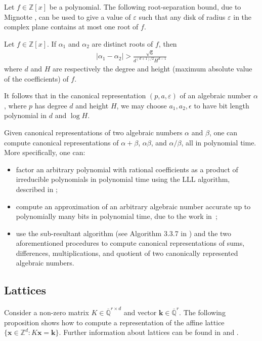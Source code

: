 Let $f\in\mathbb{Z}[x]$ be a polynomial.  The following
root-separation bound, due to Mignotte \cite{Mig82}, can be used to
give a value of $\varepsilon$ such that any disk of radius
$\varepsilon$ in the complex plane contains at most one root of $f$.
\begin{proposition}
Let $f\in\mathbb{Z}[x]$. If $\alpha_{1}$ and $\alpha_{2}$ are distinct roots of $f$, then
\begin{align*}
\lvert \alpha_{1}-\alpha_{2} \rvert > \frac{\sqrt{6}}{d^{(d+1)/2}H^{d-1}}
\end{align*}
where $d$ and $H$ are respectively the degree and height (maximum
absolute value of the coefficients) of $f$.
\end{proposition}
It follows that in the canonical representation $(p,a,\varepsilon)$ of
an algebraic number $\alpha$, where $p$ has degree $d$ and height $H$,
we may choose $a_1,a_2,\epsilon$ to have bit length polynomial in $d$
and $\log H$.

Given canonical representations of two algebraic numbers $\alpha$ and
$\beta$, one can compute canonical representations of $\alpha+\beta$,
$\alpha\beta$, and $\alpha/\beta$, all in polynomial time.  More
specifically, one can:
\begin{itemize}
\item factor an arbitrary polynomial with rational coefficients as a
  product of irreducible polynomials in polynomial time using the LLL
  algorithm, described in \cite{LenstraLenstraLovasz1982};
\item compute an approximation of an arbitrary algebraic number
  accurate up to polynomially many bits in polynomial time, due to the
  work in~\cite{Pan97};
\item use the sub-resultant algorithm (see Algorithm 3.3.7 in
  \cite{Coh93}) and the two aforementioned procedures to compute
  canonical representations of sums, differences, multiplications, and
  quotient of two canonically represented algebraic numbers.
\end{itemize}

\subsection{Lattices}

Consider a non-zero matrix $K\in\overline{\mathbb{Q}}^{r\times d}$ and vector
$\boldsymbol{k} \in \overline{\mathbb{Q}}^r$.  The following proposition shows
how to compute a representation of the affine lattice
$\{ \boldsymbol{x}\in\mathbb{Z}^d : K\boldsymbol{x} = \boldsymbol{k}
\}$.
Further information about lattices can be found in \cite{LatticeBook}
and \cite{Cohen}.

